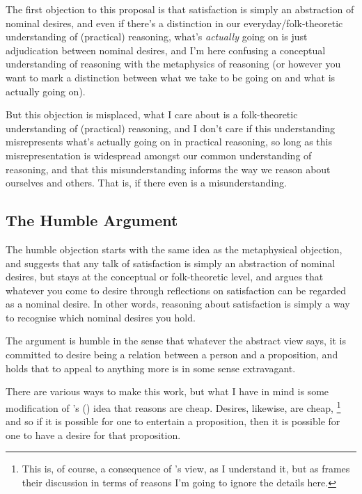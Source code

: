 \documentclass[10pt]{article}
\begin{document}
The first objection to this proposal is that satisfaction is simply an abstraction of nominal desires, and even if there's a distinction in our everyday/folk-theoretic understanding of (practical) reasoning, what's \emph{actually} going on is just adjudication between nominal desires, and I'm here confusing a conceptual understanding of reasoning with the metaphysics of reasoning (or however you want to mark a distinction between what we take to be going on and what is actually going on).

But this objection is misplaced, what I care about is a folk-theoretic understanding of (practical) reasoning, and I don't care if this understanding misrepresents what's actually going on in practical reasoning, so long as this misrepresentation is widespread amongst our common understanding of reasoning, and that this misunderstanding informs the way we reason about ourselves and others.
That is, if there even is a misunderstanding.


\subsection{The Humble Argument}
\label{sec:humble-argument}

The humble objection starts with the same idea as the metaphysical objection, and suggests that any talk of satisfaction is simply an abstraction of nominal desires, but stays at the conceptual or folk-theoretic level, and argues that whatever you come to desire through reflections on satisfaction can be regarded as a nominal desire.
In other words, reasoning about satisfaction is simply a way to recognise which nominal desires you hold.

The argument is humble in the sense that whatever the abstract view says, it is committed to desire being a relation between a person and a proposition, and holds that to appeal to anything more is in some sense extravagant.

There are various ways to make this work, but what I have in mind is some modification of \citeauthor{Schroeder:2007aa}'s (\citeyear{Schroeder:2007aa}) idea that reasons are cheap.
Desires, likewise, are cheap,\nolinebreak
\footnote{This is, of course, a consequence of \citeauthor{Schroeder:2007aa}'s view, as I understand it, but as \citeauthor{Schroeder:2007aa} frames their discussion in terms of reasons I'm going to ignore the details here.}
and so if it is possible for one to entertain a proposition, then it is possible for one to have a desire for that proposition.
\end{document}
